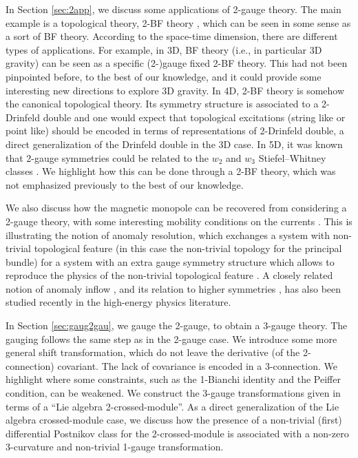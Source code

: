 \documentclass[onecolumn]{article}
\theoremstyle{theorem}
\theoremstyle{remark}
\theoremstyle{example}
\theoremstyle{definition}
\numberwithin{equation}{section}
\begin{document}
In Section \ref{sec:2app}, we discuss some applications of  2-gauge theory. The main example is a topological theory, 2-BF theory \cite{Girelli:2007tt, Martins:2010ry}, which can be seen in some sense as a sort of BF theory. According to the space-time dimension, there are different types of applications. For example, in 3D, BF theory (i.e., in particular 3D gravity) can be seen as a specific (2-)gauge fixed 2-BF theory. This had not been pinpointed before, to the best of our knowledge, and it could provide some interesting  new directions to explore 3D gravity. In 4D, 2-BF theory is somehow the canonical topological theory. Its symmetry structure is associated to a 2-Drinfeld double and one would expect that topological  excitations (string like or point like) should be encoded in terms of representations of 2-Drinfeld double, a direct generalization of the Drinfeld double in the 3D case. In 5D, it was known that 2-gauge symmetries could be related to the $w_2$ and $w_3$ Stiefel--Whitney classes \cite{JuvenWang,Thorngren2015}. We highlight how this can be done through  a 2-BF theory, which was not emphasized previously to the best of our knowledge. 

We also discuss how the magnetic monopole can be recovered from considering a 2-gauge theory, with some interesting mobility conditions on the currents \cite{Dubinkin:2020kxo}. This is illustrating the notion of {{anomaly resolution}}, which exchanges a system with non-trivial topological feature (in this case the non-trivial topology for the principal bundle) for a system with an extra gauge symmetry structure which allows to reproduce the physics of the non-trivial topological feature \cite{Cordova:2018cvg,Benini_2019}. A closely related notion of { {anomaly inflow}} \cite{Witten:2019}, and its relation to higher symmetries \cite{Thorngren:2015gtw}, has also been studied recently in the high-energy physics literature.

In Section \ref{sec:gaug2gau}, we gauge the 2-gauge, to obtain a 3-gauge theory. The gauging follows the same step as in the 2-gauge case. We introduce some more general  shift transformation, which do not leave the  derivative (of the 2-connection) covariant. The lack of covariance is encoded in a 3-connection.   We highlight where some constraints, such as the 1-Bianchi identity and the Peiffer condition, can be weakened. We construct the 3-gauge transformations given in terms of a ``Lie algebra 2-crossed-module''. As a direct generalization of the Lie algebra crossed-module case, we discuss how the presence of a non-trivial (first) differential Postnikov class for the 2-crossed-module is associated with a non-zero 3-curvature and non-trivial 1-gauge transformation. 
\end{document}
